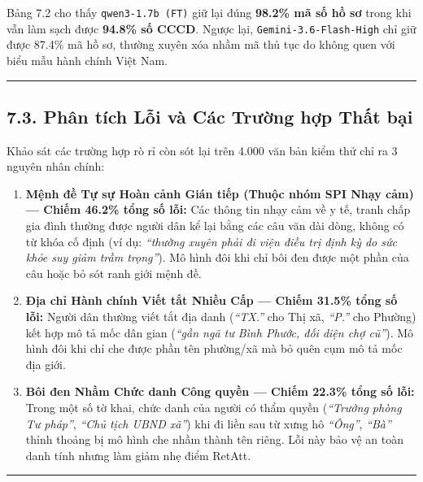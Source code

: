 \documentclass[
  11pt,
  a4paper,
]{article}
\providecommand{\tightlist}{%
  \setlength{\itemsep}{0pt}\setlength{\parskip}{0pt}}
\begin{document}
Bảng 7.2 cho thấy \texttt{qwen3-1.7b\ (FT)} giữ lại đúng \textbf{98.2\% mã số hồ sơ} trong khi vẫn
làm sạch được \textbf{94.8\% số CCCD}. Ngược lại, \texttt{Gemini-3.6-Flash-High} chỉ giữ được 87.4\%
mã hồ sơ, thường xuyên xóa nhầm mã thủ tục do không quen với biểu mẫu hành chính Việt Nam.

\begin{center}\rule{0.5\linewidth}{0.5pt}\end{center}

\subsection{7.3. Phân tích Lỗi và Các Trường hợp Thất
bại}\label{phuxe2n-tuxedch-lux1ed7i-vuxe0-cuxe1c-trux1b0ux1eddng-hux1ee3p-thux1ea5t-bux1ea1i}

Khảo sát các trường hợp rò rỉ còn sót lại trên 4.000 văn bản kiểm thử chỉ ra 3 nguyên nhân chính:

\begin{enumerate}
\def\labelenumi{\arabic{enumi}.}
\tightlist
\item
  \textbf{Mệnh đề Tự sự Hoàn cảnh Gián tiếp (Thuộc nhóm SPI Nhạy cảm) --- Chiếm 46.2\% tổng số lỗi:}
  Các thông tin nhạy cảm về y tế, tranh chấp gia đình thường được người dân kể lại bằng các câu văn
  dài dòng, không có từ khóa cố định (ví dụ: \emph{``thường xuyên phải đi viện điều trị định kỳ do
  sức khỏe suy giảm trầm trọng''}). Mô hình đôi khi chỉ bôi đen được một phần của câu hoặc bỏ sót
  ranh giới mệnh đề.
\item
  \textbf{Địa chỉ Hành chính Viết tắt Nhiều Cấp --- Chiếm 31.5\% tổng số lỗi:} Người dân thường viết
  tắt địa danh (\emph{``TX.''} cho Thị xã, \emph{``P.''} cho Phường) kết hợp mô tả mốc dân gian
  (\emph{``gần ngã tư Bình Phước, đối diện chợ cũ''}). Mô hình đôi khi chỉ che được phần tên
  phường/xã mà bỏ quên cụm mô tả mốc địa giới.
\item
  \textbf{Bôi đen Nhầm Chức danh Công quyền --- Chiếm 22.3\% tổng số lỗi:} Trong một số tờ khai,
  chức danh của người có thẩm quyền (\emph{``Trưởng phòng Tư pháp''}, \emph{``Chủ tịch UBND xã''})
  khi đi liền sau từ xưng hô \emph{``Ông''}, \emph{``Bà''} thỉnh thoảng bị mô hình che nhầm thành
  tên riêng. Lỗi này bảo vệ an toàn danh tính nhưng làm giảm nhẹ điểm RetAtt.
\end{enumerate}

\begin{center}\rule{0.5\linewidth}{0.5pt}\end{center}
\end{document}
